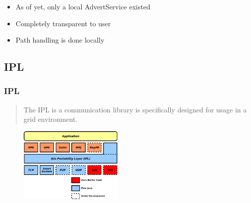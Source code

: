 \documentclass{beamer}
\begin{document}


\frame
{
	\begin{itemize}
      \item As of yet, only a local AdvertService existed
      \item Completely transparent to user
      \item Path handling is done locally
    \end{itemize}
}

\subsection{IPL}
\frame
{
	\frametitle{IPL}
	\begin{quote}
		The IPL is a communication library is specifically designed for usage in a
		grid environment.
	\end{quote}
	\begin{figure}[h]
	\begin{center}
	\includegraphics[width=5cm]{ibis-design.png} 
	\end{center}
	\end{figure}
}
\end{document}

